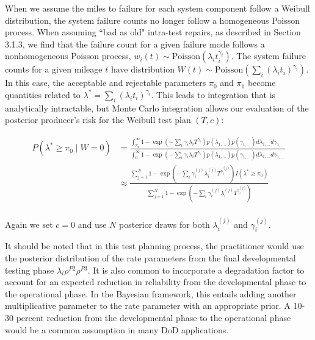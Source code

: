 \documentclass[12pt]{article}
\begin{document}
When we assume the miles to failure for each system component follow a Weibull
distribution, the system failure counts no longer follow a homogeneous Poisson
process.  When assuming ``bad as old" intra-test repairs, as described in Section 3.1.3, we find that the
failure count for a given failure mode follows a nonhomogeneous Poisson
process, $w_i(t) \sim \text{Poisson}( \lambda_i t_i^{\gamma_i} )$.  The system
failure counts for a given mileage $t$ have distribution $W(t) \sim
\text{Poisson}(\sum_i (\lambda_i t_i)^{\gamma_i})$.  In this case, the acceptable
and rejectable parameters $\pi_0$ and $\pi_1$ become quantities related to
$\lambda^* = \sum_i (\lambda_i t_i)^{\gamma_i}$.  This leads to integration that is analytically intractable, but Monte Carlo integration
allows our evaluation of the posterior producer's risk for the Weibull test plan
$(T,c)$:

$$
\begin{aligned}
	 P(\lambda^* \geq \pi_0 \; \vert \; W = 0) &= \frac{
	 \int_{\pi_0}^{\infty} 1 - \exp(- \sum_i \gamma_i \lambda_i
	 T^{\gamma_i})p(\lambda_{1,...}) p(\gamma_{1,...}) d\lambda_{1,...}
	 d\gamma_{1,...}} {\int_{0}^{\infty} 1 - \exp(- \sum_i \gamma_i \lambda_i
	 T^{\gamma_i})p(\lambda_{1,...}) p(\gamma_{1,...}) d\lambda_{1,...}
	 d\gamma_{1,...}} \\
   &\approx \frac{\sum_{j = 1}^{N} 1 - \exp(-\sum_i \gamma_i^{(j)}
   \lambda_i^{(j)} T^{\gamma_i^{(j)}}) I(\lambda^* \geq \pi_0)} {\sum_{j = 1}^{N} 1 - \exp(- \sum_i
   \gamma_i^{(j)} \lambda_i^{(j)} T^{\gamma_i^{(j)}})}
\end{aligned}
$$
\\
Again we set $c = 0$ and use $N$ posterior draws for both $\lambda_i^{(j)}$ and
$\gamma_i^{(j)}$.

It should be noted that in this test planning process, the practitioner would use
the posterior distribution of the rate parameters from the final developmental
testing phase $\lambda_i\rho^{P2}\rho^{P3}$.  It is also common to incorporate a
degradation factor to account for an expected reduction in reliability from the
developmental phase to the operational phase.  In the Bayesian framework, this
entails adding another multiplicative parameter to the rate parameter with an
appropriate prior.   A 10-30 percent reduction from the developmental phase to
the operational phase would be a common assumption in many DoD applications.
\end{document}
